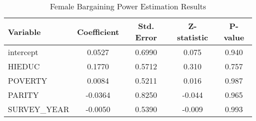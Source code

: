 \begin{table}[htbp]
\centering
\caption{Female Bargaining Power Estimation Results}
\label{tab:bargaining_results}
\begin{tabular}{lcccc}
\hline
Variable & Coefficient & Std. Error & Z-statistic & P-value \\
\hline
intercept & 0.0527 & 0.6990 & 0.075 & 0.940 \\
HIEDUC & 0.1770 & 0.5712 & 0.310 & 0.757 \\
POVERTY & 0.0084 & 0.5211 & 0.016 & 0.987 \\
PARITY & -0.0364 & 0.8250 & -0.044 & 0.965 \\
SURVEY\_YEAR & -0.0050 & 0.5390 & -0.009 & 0.993 \\
\hline
\end{tabular}
\end{table}